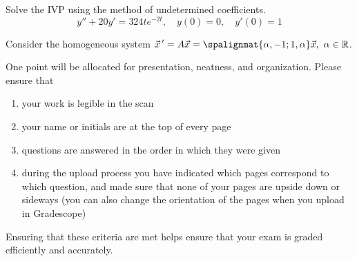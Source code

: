 \documentclass[12pt]{exam}
\begin{document}
\begin{questions}
    \newpage 
    \question[10] Solve the IVP using the method of undetermined coefficients.
    $$y''+20y'=324te^{-2t}, \quad y(0)=0, \quad y'(0) = 1$$
    
    








    \newpage 

    \question[3] %
    Consider the homogeneous system $\displaystyle \vec x \, ' = A \vec x = \spalignmat{\alpha, -1;1, \alpha}\vec x, \ \alpha \in \mathbb R$. 
    



    \newpage 
    \question[1] One point will be allocated for presentation, neatness, and organization. Please ensure that
    \begin{enumerate}
        \item your work is legible in the scan
        \item your name or initials are at the top of every page
        \item questions are answered in the order in which they were given
        \item during the upload process you have indicated which pages correspond to which question, and made sure that none of your pages are upside down or sideways (you can also change the orientation of the pages when you upload in Gradescope)
    \end{enumerate}
    Ensuring that these criteria are met helps ensure that your exam is graded efficiently and accurately. 
    


    
\end{questions}
    
\end{document}
